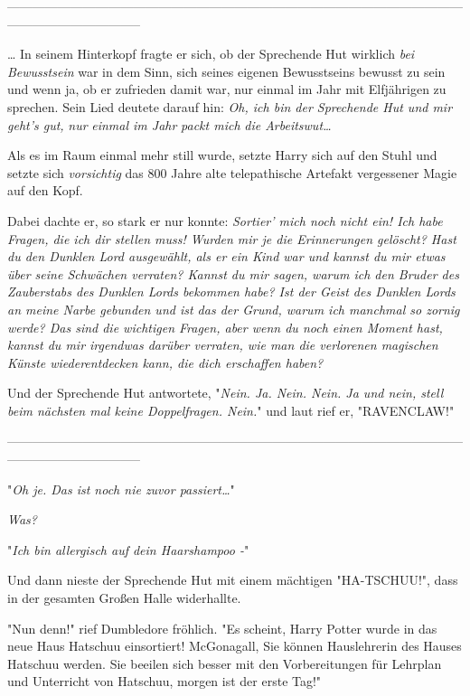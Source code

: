 {--------------------------------------------------------------------------------------------------------------------------------------------

… In seinem Hinterkopf fragte er sich, ob der Sprechende Hut wirklich \emph{bei Bewusstsein} war in dem Sinn, sich seines eigenen Bewusstseins bewusst zu sein und wenn ja, ob er zufrieden damit war, nur einmal im Jahr mit Elfjährigen zu sprechen. Sein Lied deutete darauf hin: \emph{Oh, ich bin der Sprechende Hut und mir geht's gut,} \emph{nur} \emph{einmal im Jahr} \emph{packt mich} \emph{die Arbeitswut…}

Als es im Raum einmal mehr still wurde, setzte Harry sich auf den Stuhl und setzte sich \emph{vorsichtig} das 800 Jahre alte telepathische Artefakt vergessener Magie auf den Kopf.

Dabei dachte er, so stark er nur konnte: \emph{Sortier' mich noch nicht ein! Ich habe Fragen, die ich dir stellen muss! Wurden mir je die Erinnerungen gelöscht? Hast du den Dunklen Lord ausgewählt, als er ein Kind war und kannst du mir etwas über seine Schwächen verraten? Kannst du mir sagen, warum ich den Bruder des Zauberstabs des Dunklen Lords bekommen habe? Ist der Geist des Dunklen Lords an meine Narbe gebunden und ist das der Grund, warum ich manchmal so zornig werde? Das sind die wichtigen Fragen, aber wenn du noch einen Moment hast, kannst du mir irgendwas darüber verraten, wie man die verlorenen magischen Künste wiederentdecken kann, die dich erschaffen haben?}

Und der Sprechende Hut antwortete, "\emph{Nein. Ja. Nein. Nein. Ja und nein, stell beim nächsten mal keine Doppelfragen. Nein.}" und laut rief er, "RAVENCLAW!"

--------------------------------------------------------------------------------------------------------------------------------------------

"\emph{Oh je. Das ist noch nie zuvor passiert…}"

\emph{Was?}

"\emph{Ich bin allergisch auf dein Haarshampoo -}"

Und dann nieste der Sprechende Hut mit einem mächtigen "HA-TSCHUU!", dass in der gesamten Großen Halle widerhallte.

"Nun denn!" rief Dumbledore fröhlich. "Es scheint, Harry Potter wurde in das neue Haus Hatschuu einsortiert! McGonagall, Sie können Hauslehrerin des Hauses Hatschuu werden. Sie beeilen sich besser mit den Vorbereitungen für Lehrplan und Unterricht von Hatschuu, morgen ist der erste Tag!"

}
